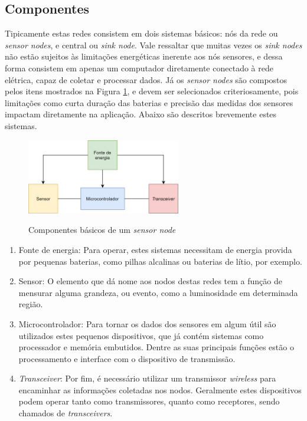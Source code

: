 \documentclass[oneside,openright,12pt]{ufsm_2015} %
\begin{document}
\subsection{Componentes}
Tipicamente estas redes consistem em dois sistemas básicos: nós da rede ou \textit{sensor nodes}, e central ou \textit{sink node}. 
Vale ressaltar que muitas vezes os \textit{sink nodes} não estão sujeitos às limitações energéticas inerente aos nós sensores, e dessa  forma consistem em apenas um computador diretamente conectado à rede elétrica, capaz de coletar e processar dados. Já os \textit{sensor nodes} são compostos pelos itens mostrados na Figura \ref{fig:sensor-node-components}, e devem ser selecionados criteriosamente, pois limitações como curta duração das baterias e precisão das medidas dos sensores impactam diretamente na aplicação. Abaixo são descritos brevemente estes sistemas.

\begin{figure}[ht]
 	    \caption{\label{exepretex} Componentes básicos de um \textit{sensor node}}
    \centering
    \includegraphics[width=0.6\textwidth]{figuras/wsn-blocks.png}
    \vspace{\baselineskip} %
        \label{fig:sensor-node-components}
\end{figure}

\begin{enumerate}
    \item Fonte de energia: Para operar, estes sistemas necessitam de energia provida por pequenas baterias, como pilhas alcalinas ou baterias de lítio, por exemplo.
    \item Sensor: O elemento que dá nome aos nodos destas redes tem a função de mensurar alguma grandeza, ou evento, como a luminosidade em determinada região.
    \item Microcontrolador: Para tornar os dados dos sensores em algum útil são utilizados estes pequenos dispositivos, que já contém sistemas como processador e memória embutidos. Dentre as suas principais funções estão o processamento e interface com o dispositivo de transmissão.
    \item \textit{Transceiver}: Por fim, é necessário utilizar um transmissor \textit{wireless} para encaminhar as informações coletadas nos nodos. Geralmente estes dispositivos podem operar tanto como transmissores, quanto como receptores, sendo chamados de \textit{transceivers}.
\end{enumerate}
\end{document}
